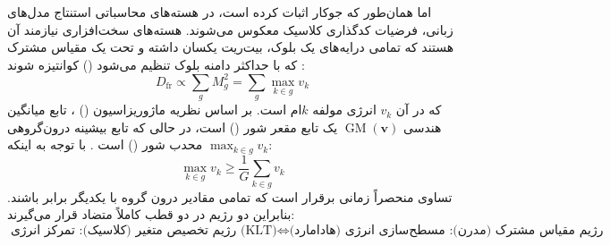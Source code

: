 اما همان‌طور که جوکار \cite{jokar2026transforms} اثبات کرده است، در هسته‌های محاسباتی استنتاج مدل‌های زبانی، فرضیات کدگذاری کلاسیک معکوس می‌شوند. هسته‌های سخت‌افزاری نیازمند آن هستند که تمامی درایه‌های یک بلوک، بیت‌ریت یکسان داشته و تحت یک مقیاس مشترک که با حداکثر دامنه بلوک تنظیم می‌شود () کوانتیزه شوند \cite{jokar2026transforms}:
\begin{equation}
    D_{\text{fr}} \propto \sum_{g} M_g^2 = \sum_{g} \max_{k \in g} v_k
\end{equation}
که در آن $v_k$ انرژی مولفه $k$ام است. بر اساس نظریه ماژوریزاسیون () \cite{marshall2011inequalities}، تابع میانگین هندسی $\operatorname{GM}(\mathbf{v})$ یک تابع مقعر شور () است، در حالی که تابع بیشینه درون‌گروهی $\max_{k \in g} v_k$ محدب شور () است \cite{jokar2026transforms}. با توجه به اینکه:
\begin{equation}
    \max_{k \in g} v_k \ge \frac{1}{G} \sum_{k \in g} v_k
\end{equation}
تساوی منحصراً زمانی برقرار است که تمامی مقادیر درون گروه با یکدیگر برابر باشند. بنابراین دو رژیم در دو قطب کاملاً متضاد قرار می‌گیرند:
\begin{equation}
    \text{رژیم تخصیص متغیر (کلاسیک): تمرکز انرژی (KLT)} \iff \text{رژیم مقیاس مشترک (مدرن): مسطح‌سازی انرژی (هادامارد)}
\end{equation}

